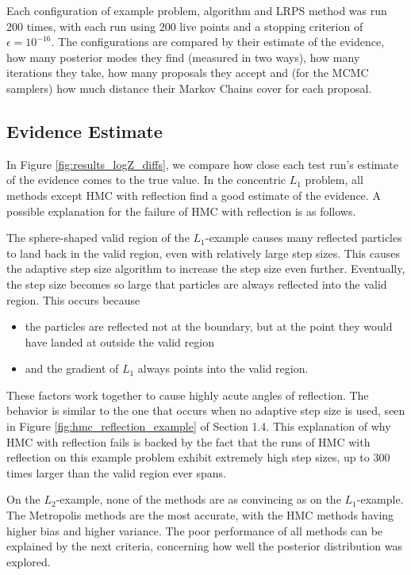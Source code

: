 \documentclass[12pt, a4paper]{report}
\begin{document}
Each configuration of example problem, algorithm and LRPS method was run 200 times, with each run using 200 live points and a stopping criterion of $\epsilon = 10^{-16}$.
The configurations are compared by their estimate of the evidence, how many posterior modes they find (measured in two ways), how many iterations they take, how many proposals they accept and (for the MCMC samplers) how much distance their Markov Chains cover for each proposal.

\subsection{Evidence Estimate}
In Figure \ref{fig:results_logZ_diffs}, we compare how close each test run's estimate of the evidence comes to the true value.
In the concentric $L_1$ problem, all methods except HMC with reflection find a good estimate of the evidence.
A possible explanation for the failure of HMC with reflection is as follows.

The sphere-shaped valid region of the $L_1$-example causes many reflected particles to land back in the valid region, even with relatively large step sizes.
This causes the adaptive step size algorithm to increase the step size even further.
Eventually, the step size becomes so large that particles are always reflected into the valid region.
This occurs because
\begin{itemize}
    \item the particles are reflected not at the boundary, but at the point they would have landed at outside the valid region
    \item and the gradient of $L_1$ always points into the valid region.
\end{itemize}
These factors work together to cause highly acute angles of reflection.
The behavior is similar to the one that occurs when no adaptive step size is used, seen in Figure \ref{fig:hmc_reflection_example} of Section 1.4.
This explanation of why HMC with reflection fails is backed by the fact that the runs of HMC with reflection on this example problem exhibit extremely high step sizes, up to 300 times larger than the valid region ever spans.

On the $L_2$-example, none of the methods are as convincing as on the $L_1$-example.
The Metropolis methods are the most accurate, with the HMC methods having higher bias and higher variance.
The poor performance of all methods can be explained by the next criteria, concerning how well the posterior distribution was explored.
\end{document}
